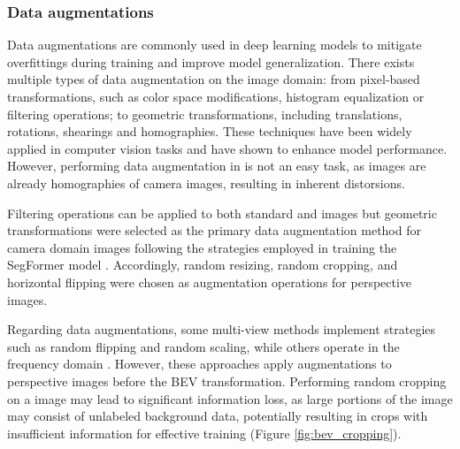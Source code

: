 \subsubsection{Data augmentations}
Data augmentations are commonly used in deep learning models to mitigate overfittings during training and improve model generalization. There exists multiple types of data augmentation on the image domain: from pixel-based transformations, such as color space modifications, histogram equalization or filtering operations; to geometric transformations, including translations, rotations, shearings and homographies. These techniques have been widely applied in computer vision tasks and have shown to enhance model performance. However, performing data augmentation in  is not an easy task, as  images are already homographies of camera images, resulting in inherent distorsions.

Filtering operations can be applied to both standard and  images but geometric transformations were selected as the primary data augmentation method for camera domain images following the strategies employed in training the SegFormer model \cite{segformer}. Accordingly, random resizing, random cropping, and horizontal flipping were chosen as augmentation operations for perspective images.

Regarding  data augmentations, some multi-view methods implement strategies such as random flipping and random scaling, while others operate in the frequency domain \cite{HSDA}. However, these approaches apply augmentations to perspective images before the BEV transformation. Performing random cropping on a  image may lead to significant information loss, as large portions of the image may consist of unlabeled background data, potentially resulting in crops with insufficient information for effective training (Figure \ref{fig:bev_cropping}). 

